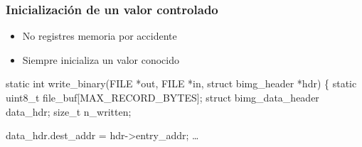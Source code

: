 \documentclass[14pt,aspectratio=169]{beamer}
\begin{document}
\begin{frame}[plain]
\end{frame}

\begin{frame}[fragile]
 \frametitle{Inicialización de un valor controlado}

 \begin{itemize}
  \item No registres memoria por accidente
  \item<2>Siempre inicializa un valor conocido
 \end{itemize}

 \begin{example}
\begin{semiverbatim}\small
static int write_binary(FILE *out, FILE *in, struct bimg_header *hdr)
\{
       static uint8_t file_buf[MAX_RECORD_BYTES];
       struct bimg_data_header data_hdr;
       size_t n_written;

       data_hdr.dest_addr = hdr->entry_addr;
       …
\end{semiverbatim}
 \end{example}
\end{frame}

\begin{frame}[plain]
\end{frame}
\end{document}
